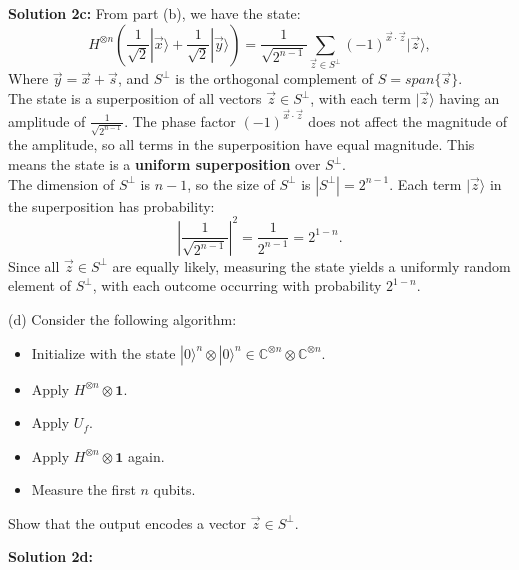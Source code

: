 \documentclass{article}
\begin{document}
\textbf{Solution 2c:} From part (b), we have the state:
$$H^{\otimes n} \left( \frac{1}{\sqrt{2}} |\vec{x}\rangle + \frac{1}{\sqrt{2}} |\vec{y}\rangle \right) = \frac{1}{\sqrt{2^{n-1}}} \sum_{\vec{z} \in S^\perp} (-1)^{\vec{x} \cdot \vec{z}} |\vec{z}\rangle,$$
Where \(\vec{y} = \vec{x} + \vec{s}\), and \(S^\perp\) is the orthogonal complement of \(S = span\{\vec{s}\}\).\\
The state is a superposition of all vectors \(\vec{z} \in S^\perp\), with each term \(|\vec{z}\rangle\) having an amplitude of \(\frac{1}{\sqrt{2^{n-1}}}\). The phase factor \((-1)^{\vec{x} \cdot \vec{z}}\) does not affect the magnitude of the amplitude, so all terms in the superposition have equal magnitude. This means the state is a \textbf{uniform superposition} over \(S^\perp\).\\
The dimension of \(S^\perp\) is \(n-1\), so the size of \(S^\perp\) is \(|S^\perp| = 2^{n-1}\). Each term \(|\vec{z}\rangle\) in the superposition has probability:
\[
\left| \frac{1}{\sqrt{2^{n-1}}} \right|^2 = \frac{1}{2^{n-1}} = 2^{1-n}.
\]
Since all \(\vec{z} \in S^\perp\) are equally likely, measuring the state yields a uniformly random element of \(S^\perp\), with each outcome occurring with probability \(2^{1-n}\).

\newpage
\begin{question}[title=QUESTION 2d]
(d) Consider the following algorithm:

\begin{itemize}
    \item Initialize with the state \(|0\rangle^{n} \otimes |0\rangle^{n} \in \mathbb{C}^{\otimes n} \otimes \mathbb{C}^{\otimes n}\).
    \item Apply \(H^{\otimes n} \otimes \mathbf{1}\).
    \item Apply \(U_{f}\).
    \item Apply \(H^{\otimes n} \otimes \mathbf{1}\) again.
    \item Measure the first \(n\) qubits.
\end{itemize}

Show that the output encodes a vector \(\vec{z} \in S^{\perp}\).
\end{question}

\textbf{Solution 2d:} 
\end{document}
